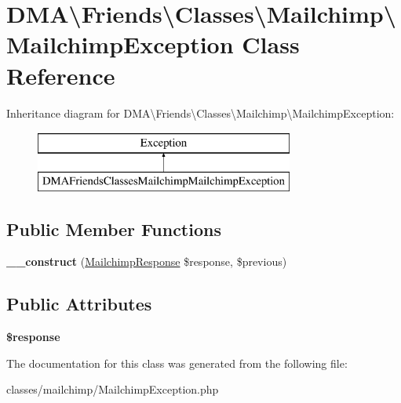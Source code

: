 \hypertarget{classDMA_1_1Friends_1_1Classes_1_1Mailchimp_1_1MailchimpException}{}\section{D\+M\+A\textbackslash{}Friends\textbackslash{}Classes\textbackslash{}Mailchimp\textbackslash{}Mailchimp\+Exception Class Reference}
\label{classDMA_1_1Friends_1_1Classes_1_1Mailchimp_1_1MailchimpException}
Inheritance diagram for D\+M\+A\textbackslash{}Friends\textbackslash{}Classes\textbackslash{}Mailchimp\textbackslash{}Mailchimp\+Exception\+:\begin{figure}[H]
\begin{center}
\leavevmode
\includegraphics[height=2.000000cm]{d5/dd7/classDMA_1_1Friends_1_1Classes_1_1Mailchimp_1_1MailchimpException}
\end{center}
\end{figure}
\subsection*{Public Member Functions}
\begin{DoxyCompactItemize}
\item 
\hypertarget{classDMA_1_1Friends_1_1Classes_1_1Mailchimp_1_1MailchimpException_ab7767ce5da8f764ce7d97ca012e8f695}{}{\bfseries \+\_\+\+\_\+construct} (\hyperlink{classDMA_1_1Friends_1_1Classes_1_1Mailchimp_1_1MailchimpResponse}{Mailchimp\+Response} \$response, \$previous)\label{classDMA_1_1Friends_1_1Classes_1_1Mailchimp_1_1MailchimpException_ab7767ce5da8f764ce7d97ca012e8f695}

\end{DoxyCompactItemize}
\subsection*{Public Attributes}
\begin{DoxyCompactItemize}
\item 
\hypertarget{classDMA_1_1Friends_1_1Classes_1_1Mailchimp_1_1MailchimpException_ae67be74606ee64dd5e75438292286ab9}{}{\bfseries \$response}\label{classDMA_1_1Friends_1_1Classes_1_1Mailchimp_1_1MailchimpException_ae67be74606ee64dd5e75438292286ab9}

\end{DoxyCompactItemize}


The documentation for this class was generated from the following file\+:\begin{DoxyCompactItemize}
\item 
classes/mailchimp/Mailchimp\+Exception.\+php\end{DoxyCompactItemize}
